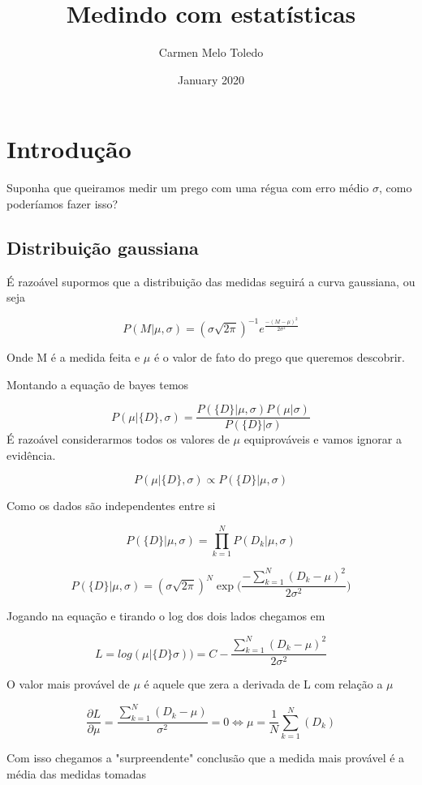 \documentclass{article}
\title{Medindo com estatísticas}
\author{Carmen Melo Toledo}
\date{January 2020}
\begin{document}
\maketitle

\section{Introdução}
Suponha que queiramos medir um prego com uma régua com erro médio $\sigma$, como poderíamos fazer isso?

\subsection{Distribuição gaussiana}
É razoável supormos que a distribuição das medidas seguirá a curva gaussiana, ou seja

\begin{equation}
    P(M|\mu, \sigma) = (\sigma \sqrt{2\pi})^{-1} e^{\frac{-(M-\mu)^2}{2\sigma^2}}
\end{equation}

Onde M é a medida feita e $\mu$ é o valor de fato do prego que queremos descobrir.

Montando a equação de bayes temos

\begin{equation*}
    P(\mu| \{D\}, \sigma) = \frac{P(\{D\}|\mu, \sigma)P(\mu|\sigma)}{P(\{D\}|\sigma)}
\end{equation*}
É razoável considerarmos todos os valores de $\mu$ equiprováveis e vamos ignorar a evidência.

\begin{equation*}
    P(\mu|\{D\},\sigma) \propto P(\{D\}|\mu, \sigma)
\end{equation*}

Como os dados são independentes entre si

\begin{equation*}
    P(\{D\}| \mu, \sigma) = \prod_{k=1}^N P(D_k|\mu,\sigma)
\end{equation*}

\begin{equation*}
    P(\{D\}| \mu, \sigma) = (\sigma\sqrt{2\pi})^N \exp{\Big( \frac{-\sum_{k=1}^{N}(D_k-\mu)^2}{2\sigma^2}\Big)}
\end{equation*}

Jogando na equação e tirando o log dos dois lados chegamos em

\begin{equation*}
    L = log(\mu| \{D\} \sigma)) = C - \frac{\sum_{k=1}^{N}(D_k-\mu)^2}{2\sigma^2}
\end{equation*}

O valor mais provável de $\mu$ é aquele que zera a derivada de L com relação a $\mu$

\begin{equation*}
    \frac{\partial L}{\partial \mu} = \frac{\sum_{k=1}^{N}(D_k-\mu)}{\sigma^2} = 0 \iff \mu = \frac{1}{N}\sum_{k=1}^{N}(D_k)
\end{equation*}

Com isso chegamos a "surpreendente" conclusão que a medida mais provável é a média das medidas tomadas
\end{document}
